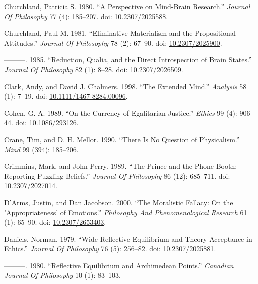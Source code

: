 \documentclass[
  10pt,
  letterpaper,
  DIV=11,
  numbers=noendperiod,
  twoside]{scrartcl}
\newlength{\cslhangindent}
\newenvironment{CSLReferences}[2] %
 {\begin{list}{}{%
  \setlength{\itemindent}{0pt}
  \setlength{\leftmargin}{0pt}
  \setlength{\parsep}{0pt}
  \ifodd #1
   \setlength{\leftmargin}{\cslhangindent}
   \setlength{\itemindent}{-1\cslhangindent}
  \fi
  \setlength{\itemsep}{#2\baselineskip}}}
 {\end{list}}
\begin{document}
\begin{CSLReferences}{1}{0}
Churchland, Patricia S. 1980. {``A Perspective on Mind-Brain
Research.''} \emph{Journal Of Philosophy} 77 (4): 185--207. doi:
\href{https://doi.org/10.2307/2025588}{10.2307/2025588}.

Churchland, Paul M. 1981. {``Eliminative Materialism and the
Propositional Attitudes.''} \emph{Journal Of Philosophy} 78 (2): 67--90.
doi: \href{https://doi.org/10.2307/2025900}{10.2307/2025900}.

---------. 1985. {``Reduction, Qualia, and the Direct Introspection of
Brain States.''} \emph{Journal Of Philosophy} 82 (1): 8--28. doi:
\href{https://doi.org/10.2307/2026509}{10.2307/2026509}.

Clark, Andy, and David J. Chalmers. 1998. {``The Extended Mind.''}
\emph{Analysis} 58 (1): 7--19. doi:
\href{https://doi.org/10.1111/1467-8284.00096}{10.1111/1467-8284.00096}.

Cohen, G. A. 1989. {``On the Currency of Egalitarian Justice.''}
\emph{Ethics} 99 (4): 906--44. doi:
\href{https://doi.org/10.1086/293126}{10.1086/293126}.

Crane, Tim, and D. H. Mellor. 1990. {``There Is No Question of
Physicalism.''} \emph{Mind} 99 (394): 185--206.

Crimmins, Mark, and John Perry. 1989. {``The Prince and the Phone Booth:
Reporting Puzzling Beliefs.''} \emph{Journal Of Philosophy} 86 (12):
685--711. doi: \href{https://doi.org/10.2307/2027014}{10.2307/2027014}.

D'Arms, Justin, and Dan Jacobson. 2000. {``The Moralistic Fallacy: On
the 'Appropriateness' of Emotions.''} \emph{Philosophy And
Phenomenological Research} 61 (1): 65--90. doi:
\href{https://doi.org/10.2307/2653403}{10.2307/2653403}.

Daniels, Norman. 1979. {``Wide Reflective Equilibrium and Theory
Acceptance in Ethics.''} \emph{Journal Of Philosophy} 76 (5): 256--82.
doi: \href{https://doi.org/10.2307/2025881}{10.2307/2025881}.

---------. 1980. {``Reflective Equilibrium and Archimedean Points.''}
\emph{Canadian Journal Of Philosophy} 10 (1): 83--103.


\end{CSLReferences}
\end{document}
